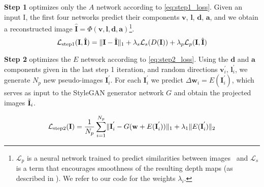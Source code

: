 \textbf{Step 1} optimizes only the $A$ network according to \autoref{eq:step1_loss}. Given an input $\text{I}$, the first four networks predict their components $\textbf{v}$, $\textbf{l}$, $\textbf{d}$, $\textbf{a}$, and we obtain a reconstructed image $\hat{\textbf{I}} = \Phi (\textbf{v}, \textbf{l}, \textbf{d}, \textbf{a})$\footnote{$\mathcal{L}_{p}$ is a neural network trained to predict similarities between images~\cite{perceptual} and $\mathcal{L}_s$ is a term that encourages smoothness of the resulting depth maps (as described in \cite{smooth-loss}). We refer to our code for the weights $\lambda_i$.}.
\begin{equation}
    \mathcal{L}_{\text{step1}}(\textbf{I}, \hat{\textbf{I}}) = 
    \lVert\textbf{I} - \hat{\textbf{I}}\rVert_1
     + \lambda_{s}\mathcal{L}_{s}(D(\textbf{I})) + \lambda_p \mathcal{L}_{p}(\textbf{I}, \hat{\textbf{I}})
    \label{eq:step1_loss}
\end{equation}

\textbf{Step 2}  optimizes the $E$ network according to \autoref{eq:step2_loss}. Using the $\textbf{d}$ and $\textbf{a}$ components given in the last step 1 iteration, and random directions $\textbf{v}_{i}^{'}$, $\textbf{l}_{i}^{'}$, we generate $N_p$ new pseudo-images $\textbf{I}_{i}^{'}$.
For each $\textbf{I}_{i}^{'}$ we predict $\Delta \textbf{w}_i = E(\textbf{I}_{i}^{'})$, which serves as input to the StyleGAN generator network $G$ and obtain the projected images $\Tilde{\textbf{I}}_i$. 

\begin{equation}
    \mathcal{L}_{\text{step2}}(\textbf{I}) = \frac{1}{N_p}
    \sum_{i=1}^{N_p} \lVert\textbf{I}_{i}^{'} - 
    G(\textbf{w} + E(\textbf{I}_{i}^{'}))
    \rVert_1 + \lambda_1 \lVert E(\textbf{I}_{i}^{'})\rVert_2
    \label{eq:step2_loss}
\end{equation}


